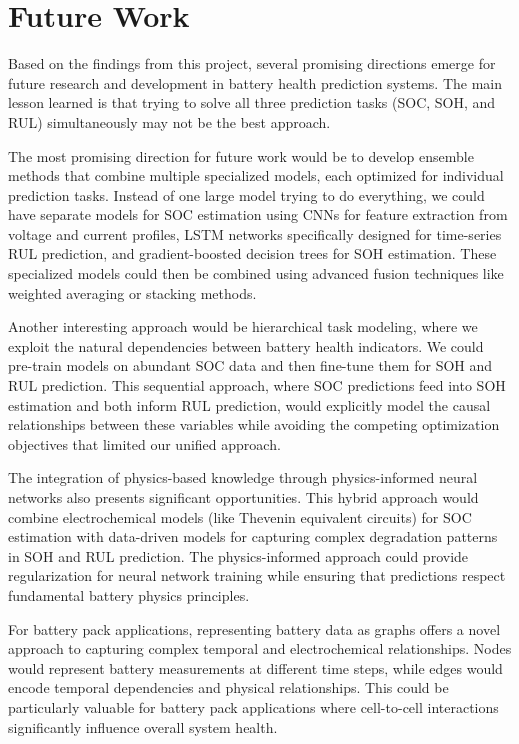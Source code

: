 \section{Future Work}
\label{sec:future_work}

Based on the findings from this project, several promising directions emerge for future research and development in battery health prediction systems. The main lesson learned is that trying to solve all three prediction tasks (SOC, SOH, and RUL) simultaneously may not be the best approach.

The most promising direction for future work would be to develop ensemble methods that combine multiple specialized models, each optimized for individual prediction tasks. Instead of one large model trying to do everything, we could have separate models for SOC estimation using CNNs for feature extraction from voltage and current profiles, LSTM networks specifically designed for time-series RUL prediction, and gradient-boosted decision trees for SOH estimation. These specialized models could then be combined using advanced fusion techniques like weighted averaging or stacking methods.

Another interesting approach would be hierarchical task modeling, where we exploit the natural dependencies between battery health indicators. We could pre-train models on abundant SOC data and then fine-tune them for SOH and RUL prediction. This sequential approach, where SOC predictions feed into SOH estimation and both inform RUL prediction, would explicitly model the causal relationships between these variables while avoiding the competing optimization objectives that limited our unified approach.

The integration of physics-based knowledge through physics-informed neural networks also presents significant opportunities. This hybrid approach would combine electrochemical models (like Thevenin equivalent circuits) for SOC estimation with data-driven models for capturing complex degradation patterns in SOH and RUL prediction. The physics-informed approach could provide regularization for neural network training while ensuring that predictions respect fundamental battery physics principles.

For battery pack applications, representing battery data as graphs offers a novel approach to capturing complex temporal and electrochemical relationships. Nodes would represent battery measurements at different time steps, while edges would encode temporal dependencies and physical relationships. This could be particularly valuable for battery pack applications where cell-to-cell interactions significantly influence overall system health.

